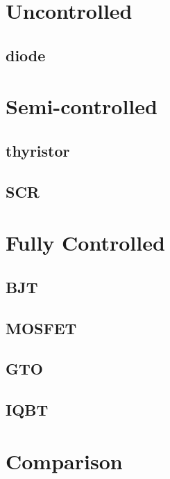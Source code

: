\section{Uncontrolled}
\subsection{diode}
\section{Semi-controlled}
\subsection{thyristor}
\subsection{SCR}
\section{Fully Controlled }
\subsection{BJT}
\subsection{MOSFET}
\subsection{GTO}
\subsection{IQBT}
\section{Comparison}










